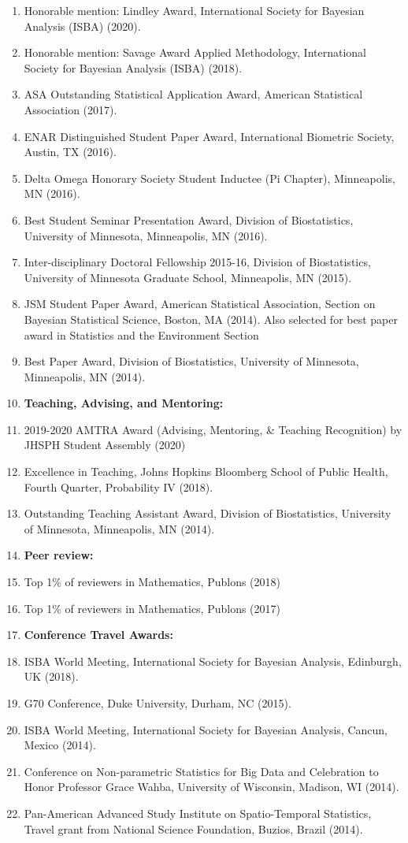 \documentclass[10pt]{article}
\newcommand{\mydot}[1]{\begin{enumerate}[label=$\circ$,leftmargin=\parindent]\setlength{\itemsep}{#1}}
\newcommand{\ee}{\end{enumerate}}
\begin{document}
\mydot{-0.1em}
\item Honorable mention: Lindley Award, International Society
for Bayesian Analysis (ISBA) (2020).
\item Honorable mention: Savage Award Applied Methodology, International Society
for Bayesian Analysis (ISBA) (2018).
\item ASA Outstanding Statistical Application Award, American Statistical
Association (2017).
\item ENAR Distinguished Student Paper Award, International Biometric Society,
Austin, TX (2016).
\item Delta Omega Honorary Society Student Inductee (Pi Chapter), Minneapolis,
MN (2016).
\item Best Student Seminar Presentation Award, Division of Biostatistics, University
of Minnesota, Minneapolis, MN (2016).
\item Inter-disciplinary Doctoral Fellowship 2015-16, Division of Biostatistics, University
of Minnesota Graduate School, Minneapolis, MN (2015).
\item JSM Student Paper Award, American Statistical Association, Section on
Bayesian Statistical Science, Boston, MA (2014).
Also selected for best paper award in Statistics and the Environment Section
\item Best Paper Award, Division of Biostatistics, University of Minnesota, Minneapolis,
MN (2014).\\
\item \textbf{Teaching, Advising, and Mentoring:} 
\item 2019-2020 AMTRA Award (Advising, Mentoring, \& Teaching Recognition) by JHSPH Student Assembly (2020)
\item Excellence in Teaching, Johns Hopkins Bloomberg School of Public Health,
Fourth Quarter, Probability IV (2018).
\item Outstanding Teaching Assistant Award, Division of Biostatistics, University of
Minnesota, Minneapolis, MN (2014).\\
\item \textbf{Peer review:} 
\item Top 1\% of reviewers in Mathematics, Publons (2018)
\item Top 1\% of reviewers in Mathematics, Publons (2017)
\item \textbf{Conference Travel Awards:} \\
\item ISBA World Meeting, International Society for Bayesian Analysis, Edinburgh, UK (2018).
\item G70 Conference, Duke University, Durham, NC (2015).
\item ISBA World Meeting, International Society for Bayesian Analysis, Cancun,
Mexico (2014).
\item Conference on Non-parametric Statistics for Big Data and Celebration to Honor
Professor Grace Wahba, University of Wisconsin, Madison, WI (2014).
\item Pan-American Advanced Study Institute on Spatio-Temporal Statistics, Travel
grant from National Science Foundation, Buzios, Brazil (2014).
\ee
\end{document}
